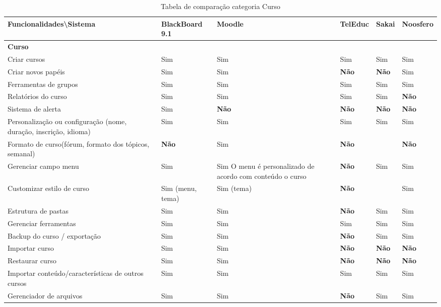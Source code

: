 \begin{landscape}
\begin{table}[H]
\begin{tabular}{|@{}p{5.5cm}|p{3.5cm}|p{3.5cm}|p{3.5cm}|p{3.5cm}|p{3.5cm}@{}|}
\hline
\textbf{Funcionalidades\textbackslash Sistema} & \textbf{BlackBoard 9.1} & \textbf{Moodle} & \textbf{TelEduc} & \textbf{Sakai} & \textbf{Noosfero}\\ \hline
\textbf{Curso}&&   &&  &   \\
Criar cursos  & Sim & Sim & Sim  & Sim   & Sim    \\
Criar novos papéis& Sim & Sim & \textbf{Não} & \textbf{Não}    & Sim \\
Ferramentas de grupos & Sim & Sim & Sim& Sim   & Sim \\
Relatórios do curso   & Sim & Sim & Sim& Sim   & \textbf{Não}  \\
Sistema de alerta & Sim & \textbf{Não}  & \textbf{Não} & \textbf{Não}    & \textbf{Não}  \\
Personalização ou configuração (nome, duração, inscrição, idioma) & Sim & Sim & Sim& Sim   & Sim    \\
Formato de curso(fórum, formato dos tópicos, semanal)& \textbf{Não}  & Sim & \textbf{Não} &  & \textbf{Não}     \\
Gerenciar campo menu  & Sim & Sim {\tiny O menu é personalizado de acordo com conteúdo o curso} & \textbf{Não} & Sim   & Sim    \\
Customizar estilo de curso & Sim {\tiny (menu, tema)} & Sim {\tiny(tema) }& \textbf{Não} &  & Sim\\
Estrutura de pastas   & Sim & Sim & \textbf{Não} & Sim   & Sim    \\
Gerenciar ferramentas & Sim & Sim & Sim& Sim   & Sim    \\
Backup do curso / exportação & Sim & Sim & \textbf{Não} & Sim   & Sim\\
Importar curso& Sim & Sim & \textbf{Não} & \textbf{Não}    & \textbf{Não}  \\
Restaurar curso & Sim & Sim & \textbf{Não} & \textbf{Não}    & \textbf{Não}     \\
Importar conteúdo/características de outros cursos   & Sim & Sim & Sim & Sim   & Sim    \\
Gerenciador de arquivos    & Sim & Sim & \textbf{Não} & Sim   & Sim \\ \hline
\end{tabular}
\caption{Tabela de comparação categoria Curso}
\label{tab:curso}
\end{table}


\end{landscape}
